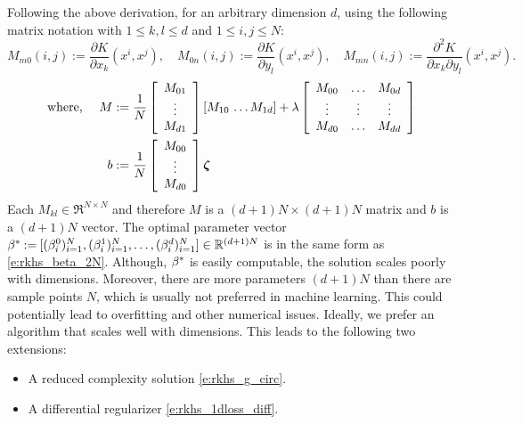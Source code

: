 Following the above derivation, for an arbitrary dimension $d$, using the following matrix notation with $1 \leq k,l \leq d$ and $1 \leq i,j \leq N$:
\[
M_{m0}(i,j) := \frac{\partial K}{\partial x_k}(x^i,x^j),
\quad 
M_{0n}(i,j) := \frac{\partial K}{\partial y_l}(x^i,x^j),
\quad
M_{mn}(i,j) := \frac{\partial^2 K}{\partial x_k \partial y_l}(x^i,x^j).
\]	
\begin{equation}
\begin{aligned}
\text{where,
}
\quad
M & := \frac{1}{N} \left[\begin{array}{c} M_{01} \\ \vdots \\ M_{d1} \end{array}\right] [ M_{10} \, \hdots M_{1d}] + \lambda  \left[
\begin{array}{c c c}
M_{00}  & \hdots & M_{0d}\\
\vdots & \vdots &  \vdots \\
M_{d0} & \hdots & M_{dd}
\end{array}
\right] \\
b & :=  \frac{1}{N} \left[ \begin{array}{c} M_{00} \\ \vdots \\ M_{d0} \end{array}\right] \boldsymbol{\zeta}
\end{aligned}
\label{e:rkhs_beta_optimal_d}
\end{equation}
Each $M_{kl} \in \Re^{N \times N}$ and therefore $M$ is a $(d+1) N \times (d+1) N$ matrix and $b$ is a $(d+1) N$ vector. The optimal parameter vector $\beta^* \mathbin{:=} [ (\beta^0_i)_{i=1}^N, (\beta^1_i)_{i=1}^N, \hdots, (\beta^d_i)_{i=1}^N] \in \mathbb{R}^{(d+1) N}$ is in the same form as \eqref{e:rkhs_beta_2N}. Although, $\beta^*$ is easily computable, the solution scales poorly with dimensions. 
Moreover, there are more parameters $(d+1)N$ than there are sample points $N$, which is usually not preferred in machine learning. This could potentially lead to overfitting and other numerical issues.   
Ideally, we prefer an algorithm that scales well with dimensions. This leads to the following two extensions:
\begin{itemize}
	\item A reduced complexity solution \eqref{e:rkhs_g_circ}.
	\item A differential regularizer \eqref{e:rkhs_1dloss_diff}.
\end{itemize}
